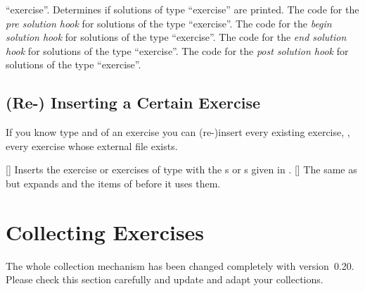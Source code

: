 \documentclass{xsim-manual}
\begin{document}
\begin{options}
    \enquote{exercise}.
    Determines if solutions of type \enquote{exercise} are printed.
  \Default
    The code for the \emph{pre solution hook} for solutions of the type
    \enquote{exercise}.
  \Default
    The code for the \emph{begin solution hook} for solutions of the type
    \enquote{exercise}.
  \Default
    The code for the \emph{end solution hook} for solutions of the type
    \enquote{exercise}.
  \Default
    The code for the \emph{post solution hook} for solutions of the type
    \enquote{exercise}.
\end{options}

\subsection{(Re-) Inserting a Certain Exercise}
If you know type and  of an exercise you can (re-)insert every
existing exercise, \ie, every exercise whose external file exists.
\begin{commands}
  []
    Inserts the exercise or exercises of type
     with the s or s given in .
  []
    The same as  but expands
     and the items of  before it uses them.
\end{commands}
\begin{example}
\end{example}

\section{Collecting Exercises}\label{sec:collecting-exercises}

\begin{bewareofthedog}
  The whole collection mechanism has been changed completely with
  version~0.20.  Please check this section carefully and update and adapt your
  collections.
\end{bewareofthedog}
\end{document}
